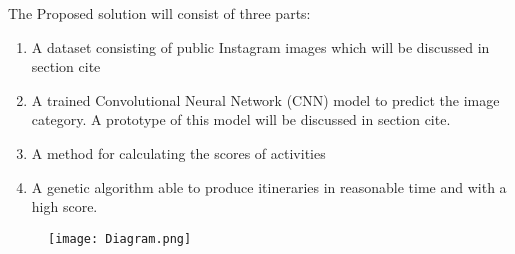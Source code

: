The Proposed solution will consist of three parts:

\begin{enumerate}
    \item A dataset consisting of public Instagram images which will
    be discussed in section cite
    \item A trained Convolutional Neural Network (CNN) model to
    predict the image category. A prototype of this model will be
    discussed in section cite.
    \item A method for calculating the scores of activities
    \item A genetic algorithm able to produce itineraries in
    reasonable time and with a high score.
\end{enumerate}


\begin{figure}[H]
    \centering
    \texttt{[image: Diagram.png]}
    \label{diagram}
\end{figure}